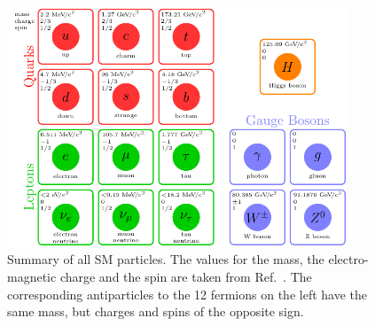 \begin{figure}
\centering
\includegraphics[width=0.9\textwidth]{02-StandardModel/tikz/pdf/SM.pdf}
\caption{Summary of all SM particles. The values for the mass, the
electro-magnetic charge and the spin are taken from Ref.~\cite{PDG2016}. The
corresponding antiparticles to the 12 fermions on the left have the same
mass, but charges and spins of the opposite sign.}
\label{fig:standardmodel:particles}
\end{figure}
